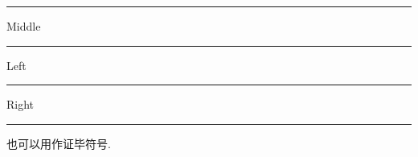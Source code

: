 \documentclass[nofonts]{ctexart}
\begin{document}
\rule{1pt}{1em}Middle\rule{1pt}{1em}

Left\rule[0.5ex]{2cm}{0.6pt}Right

\rule[-0.1em]{1em}{1em} 也可以用作证毕符号.
\end{document}
